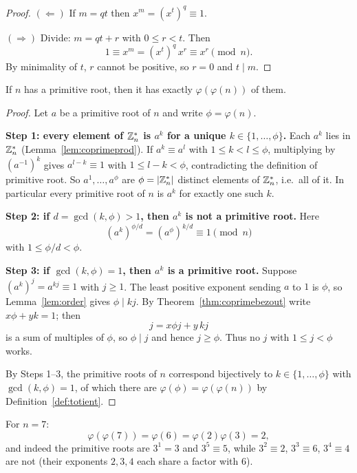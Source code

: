 \documentclass[11pt]{article}
\begin{document}
\begin{proof}
$(\Leftarrow)$ If $m=qt$ then $x^m=(x^t)^q\equiv1$.

\noindent$(\Rightarrow)$ Divide: $m=qt+r$ with $0\le r<t$. Then
\[
1\equiv x^m=(x^t)^q\,x^r\equiv x^r\pmod n.
\]
By minimality of $t$, $r$ cannot be positive, so $r=0$ and $t\mid m$.
\end{proof}

\begin{theorem}
\label{thm:primrootcount}
If $n$ has a primitive root, then it has exactly $\varphi(\varphi(n))$ of them.
\end{theorem}

\begin{proof}
Let $a$ be a primitive root of $n$ and write $\phi=\varphi(n)$.

\medskip
\noindent\textbf{Step 1: every element of $\mathbb{Z}_n^*$ is $a^k$ for a unique $k\in\{1,\dots,\phi\}$.} Each $a^k$ lies in $\mathbb{Z}_n^*$ (Lemma~\ref{lem:coprimeprod}). If $a^k\equiv a^l$ with $1\le k<l\le\phi$, multiplying by $(a^{-1})^k$ gives $a^{l-k}\equiv1$ with $1\le l-k<\phi$, contradicting the definition of primitive root. So $a^1,\dots,a^\phi$ are $\phi=|\mathbb{Z}_n^*|$ distinct elements of $\mathbb{Z}_n^*$, i.e.\ all of it. In particular every primitive root of $n$ is $a^k$ for exactly one such $k$.

\medskip
\noindent\textbf{Step 2: if $d=\gcd(k,\phi)>1$, then $a^k$ is not a primitive root.} Here
\[
(a^k)^{\phi/d}=(a^{\phi})^{k/d}\equiv1 \pmod n
\]
with $1\le\phi/d<\phi$.

\medskip
\noindent\textbf{Step 3: if $\gcd(k,\phi)=1$, then $a^k$ is a primitive root.} Suppose $(a^k)^j=a^{kj}\equiv1$ with $j\ge1$. The least positive exponent sending $a$ to $1$ is $\phi$, so Lemma~\ref{lem:order} gives $\phi\mid kj$. By Theorem~\ref{thm:coprimebezout} write $x\phi+yk=1$; then
\[
j=x\phi j+y\,kj
\]
is a sum of multiples of $\phi$, so $\phi\mid j$ and hence $j\ge\phi$. Thus no $j$ with $1\le j<\phi$ works.

\medskip
\noindent By Steps 1--3, the primitive roots of $n$ correspond bijectively to $k\in\{1,\dots,\phi\}$ with $\gcd(k,\phi)=1$, of which there are $\varphi(\phi)=\varphi(\varphi(n))$ by Definition~\ref{def:totient}.
\end{proof}

\begin{note}
For $n=7$:
\[
\varphi(\varphi(7))=\varphi(6)=\varphi(2)\varphi(3)=2,
\]
and indeed the primitive roots are $3^1=3$ and $3^5\equiv5$, while $3^2\equiv2$, $3^3\equiv6$, $3^4\equiv4$ are not (their exponents $2,3,4$ each share a factor with $6$).
\end{note}
\end{document}
